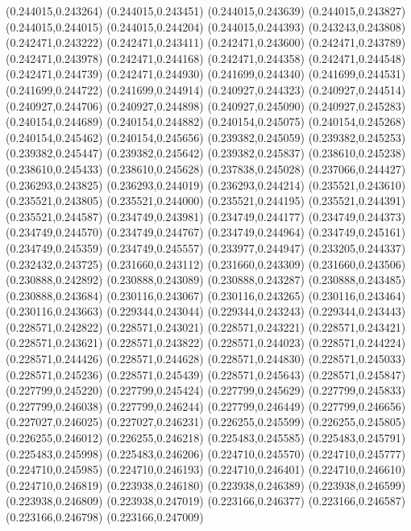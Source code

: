 (0.244015,0.243264)
(0.244015,0.243451)
(0.244015,0.243639)
(0.244015,0.243827)
(0.244015,0.244015)
(0.244015,0.244204)
(0.244015,0.244393)
(0.243243,0.243808)
(0.242471,0.243222)
(0.242471,0.243411)
(0.242471,0.243600)
(0.242471,0.243789)
(0.242471,0.243978)
(0.242471,0.244168)
(0.242471,0.244358)
(0.242471,0.244548)
(0.242471,0.244739)
(0.242471,0.244930)
(0.241699,0.244340)
(0.241699,0.244531)
(0.241699,0.244722)
(0.241699,0.244914)
(0.240927,0.244323)
(0.240927,0.244514)
(0.240927,0.244706)
(0.240927,0.244898)
(0.240927,0.245090)
(0.240927,0.245283)
(0.240154,0.244689)
(0.240154,0.244882)
(0.240154,0.245075)
(0.240154,0.245268)
(0.240154,0.245462)
(0.240154,0.245656)
(0.239382,0.245059)
(0.239382,0.245253)
(0.239382,0.245447)
(0.239382,0.245642)
(0.239382,0.245837)
(0.238610,0.245238)
(0.238610,0.245433)
(0.238610,0.245628)
(0.237838,0.245028)
(0.237066,0.244427)
(0.236293,0.243825)
(0.236293,0.244019)
(0.236293,0.244214)
(0.235521,0.243610)
(0.235521,0.243805)
(0.235521,0.244000)
(0.235521,0.244195)
(0.235521,0.244391)
(0.235521,0.244587)
(0.234749,0.243981)
(0.234749,0.244177)
(0.234749,0.244373)
(0.234749,0.244570)
(0.234749,0.244767)
(0.234749,0.244964)
(0.234749,0.245161)
(0.234749,0.245359)
(0.234749,0.245557)
(0.233977,0.244947)
(0.233205,0.244337)
(0.232432,0.243725)
(0.231660,0.243112)
(0.231660,0.243309)
(0.231660,0.243506)
(0.230888,0.242892)
(0.230888,0.243089)
(0.230888,0.243287)
(0.230888,0.243485)
(0.230888,0.243684)
(0.230116,0.243067)
(0.230116,0.243265)
(0.230116,0.243464)
(0.230116,0.243663)
(0.229344,0.243044)
(0.229344,0.243243)
(0.229344,0.243443)
(0.228571,0.242822)
(0.228571,0.243021)
(0.228571,0.243221)
(0.228571,0.243421)
(0.228571,0.243621)
(0.228571,0.243822)
(0.228571,0.244023)
(0.228571,0.244224)
(0.228571,0.244426)
(0.228571,0.244628)
(0.228571,0.244830)
(0.228571,0.245033)
(0.228571,0.245236)
(0.228571,0.245439)
(0.228571,0.245643)
(0.228571,0.245847)
(0.227799,0.245220)
(0.227799,0.245424)
(0.227799,0.245629)
(0.227799,0.245833)
(0.227799,0.246038)
(0.227799,0.246244)
(0.227799,0.246449)
(0.227799,0.246656)
(0.227027,0.246025)
(0.227027,0.246231)
(0.226255,0.245599)
(0.226255,0.245805)
(0.226255,0.246012)
(0.226255,0.246218)
(0.225483,0.245585)
(0.225483,0.245791)
(0.225483,0.245998)
(0.225483,0.246206)
(0.224710,0.245570)
(0.224710,0.245777)
(0.224710,0.245985)
(0.224710,0.246193)
(0.224710,0.246401)
(0.224710,0.246610)
(0.224710,0.246819)
(0.223938,0.246180)
(0.223938,0.246389)
(0.223938,0.246599)
(0.223938,0.246809)
(0.223938,0.247019)
(0.223166,0.246377)
(0.223166,0.246587)
(0.223166,0.246798)
(0.223166,0.247009)
